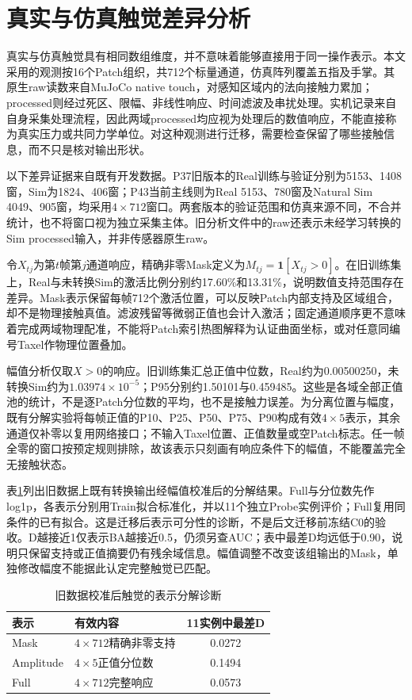\section{真实与仿真触觉差异分析}
\label{sec:ch05_real_sim_difference}

真实与仿真触觉具有相同数组维度，并不意味着能够直接用于同一操作表示。本文采用的观测按16个Patch组织，共712个标量通道，仿真阵列覆盖五指及手掌。其原生raw读数来自MuJoCo native touch，对感知区域内的法向接触力累加；processed则经过死区、限幅、非线性响应、时间滤波及串扰处理。实机记录来自自身采集处理流程，因此两域processed均应视为处理后的数值响应，不能直接称为真实压力或共同力学单位。对这种观测进行迁移，需要检查保留了哪些接触信息，而不只是核对输出形状。

以下差异证据来自既有开发数据。P37旧版本的Real训练与验证分别为5153、1408窗，Sim为1824、406窗；P43当前主线则为Real 5153、780窗及Natural Sim 4049、905窗，均采用$4\times712$窗口。两套版本的验证范围和仿真来源不同，不合并统计，也不将窗口视为独立采集主体。旧分析文件中的raw还表示未经学习转换的Sim processed输入，并非传感器原生raw。

令$X_{tj}$为第$t$帧第$j$通道响应，精确非零Mask定义为$M_{tj}=\mathbf1[X_{tj}>0]$。在旧训练集上，Real与未转换Sim的激活比例分别约17.60\%和13.31\%，说明数值支持范围存在差异。Mask表示保留每帧712个激活位置，可以反映Patch内部支持及区域组合，却不是物理接触真值。滤波残留等微弱正值也会计入激活；固定通道顺序更不意味着完成两域物理配准，不能将Patch索引热图解释为认证曲面坐标，或对任意同编号Taxel作物理位置叠加。

幅值分析仅取$X>0$的响应。旧训练集汇总正值中位数，Real约为0.00500250，未转换Sim约为$1.03974\times10^{-5}$；P95分别约1.50101与0.459485。这些是各域全部正值池的统计，不是逐Patch分位数的平均，也不是接触力误差。为分离位置与幅度，既有分解实验将每帧正值的P10、P25、P50、P75、P90构成有效$4\times5$表示，其余通道仅补零以复用网络接口；不输入Taxel位置、正值数量或空Patch标志。任一帧全零的窗口按预定规则排除，故该表示只刻画有响应条件下的幅值，不能覆盖完全无接触状态。

表\ref{tab:ch05_domain_feature_difference}列出旧数据上既有转换输出经幅值校准后的分解结果。Full与分位数先作log1p，各表示分别用Train拟合标准化，并以11个独立Probe实例评价；Full复用同条件的已有拟合。这是迁移后表示可分性的诊断，不是后文迁移前冻结C0的验收。D越接近1仅表示BA越接近0.5，仍须另查AUC；表中最差D均远低于0.90，说明只保留支持或正值摘要仍有残余域信息。幅值调整不改变该组输出的Mask，单独修改幅度不能据此认定完整触觉已匹配。

\begin{table}[htbp]
 \centering\small
 \caption{旧数据校准后触觉的表示分解诊断}
 \label{tab:ch05_domain_feature_difference}
 \begin{tabular}{llc}
 \hline
 表示&有效内容&11实例中最差D\\\hline
 Mask&$4\times712$精确非零支持&0.0272\\
 Amplitude&$4\times5$正值分位数&0.1494\\
 Full&$4\times712$完整响应&0.0573\\\hline
 \end{tabular}
\end{table}

